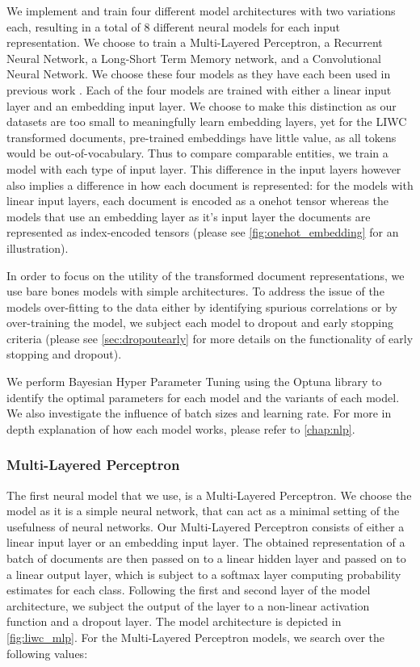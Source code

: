 We implement and train four different model architectures with two variations each, resulting in a total of 8 different neural models for each input representation. We choose to train a Multi-Layered Perceptron, a Recurrent Neural Network, a Long-Short Term Memory network, and a Convolutional Neural Network. We choose these four models as they have each been used in previous work \cite{CITE: Find papers with Neural approaches for each of the models}. Each of the four models are trained with either a linear input layer and an embedding input layer. We choose to make this distinction as our datasets are too small to meaningfully learn embedding layers, yet for the LIWC transformed documents, pre-trained embeddings have little value, as all tokens would be out-of-vocabulary. Thus to compare comparable entities, we train a model with each type of input layer. This difference in the input layers however also implies a difference in how each document is represented: for the models with linear input layers, each document is encoded as a onehot tensor whereas the models that use an embedding layer as it's input layer the documents are represented as index-encoded tensors (please see \autoref{fig:onehot_embedding} for an illustration).

In order to focus on the utility of the transformed document representations, we use bare bones models with simple architectures. To address the issue of the models over-fitting to the data either by identifying spurious correlations or by over-training the model, we subject each model to dropout and early stopping criteria (please see \autoref{sec:dropoutearly} for more details on the functionality of early stopping and dropout).

We perform Bayesian Hyper Parameter Tuning using the Optuna library \cite{CITE: Optuna} to identify the optimal parameters for each model and the variants of each model. We also investigate the influence of batch sizes and learning rate. For more in depth explanation of how each model works, please refer to \autoref{chap:nlp}.

\subsubsection{Multi-Layered Perceptron}

The first neural model that we use, is a Multi-Layered Perceptron. We choose the model as it is a simple neural network, that can act as a minimal setting of the usefulness of neural networks. Our Multi-Layered Perceptron consists of either a linear input layer or an embedding input layer. The obtained representation of a batch of documents are then passed on to a linear hidden layer and passed on to a linear output layer, which is subject to a softmax layer computing probability estimates for each class. Following the first and second layer of the model architecture, we subject the output of the layer to a non-linear activation function and a dropout layer. The model architecture is depicted in \autoref{fig:liwc_mlp}. For the Multi-Layered Perceptron models, we search over the following values:

